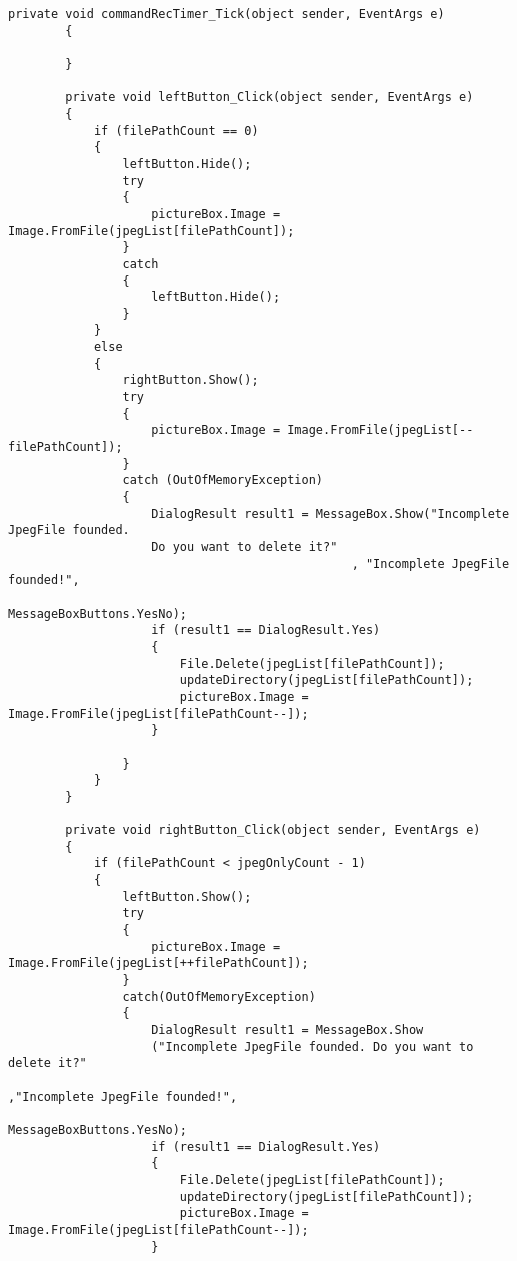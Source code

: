 \begin{lstlisting}[caption=Main Form of GUI, label=appen:main_form]
        private void commandRecTimer_Tick(object sender, EventArgs e)
        {

        }

        private void leftButton_Click(object sender, EventArgs e)
        {
            if (filePathCount == 0)
            {
                leftButton.Hide();
                try
                {
                    pictureBox.Image = Image.FromFile(jpegList[filePathCount]);
                }
                catch
                {
                    leftButton.Hide();
                }
            }
            else
            {
                rightButton.Show();
                try
                {
                    pictureBox.Image = Image.FromFile(jpegList[--filePathCount]);
                }
                catch (OutOfMemoryException)
                {
                    DialogResult result1 = MessageBox.Show("Incomplete JpegFile founded. 
                    Do you want to delete it?"
                                                , "Incomplete JpegFile founded!",
                                                 MessageBoxButtons.YesNo);
                    if (result1 == DialogResult.Yes)
                    {
                        File.Delete(jpegList[filePathCount]);
                        updateDirectory(jpegList[filePathCount]);
                        pictureBox.Image = Image.FromFile(jpegList[filePathCount--]);
                    }
                    
                }
            }
        }

        private void rightButton_Click(object sender, EventArgs e)
        {
            if (filePathCount < jpegOnlyCount - 1)
            {
                leftButton.Show();
                try
                {
                    pictureBox.Image = Image.FromFile(jpegList[++filePathCount]);
                }
                catch(OutOfMemoryException)
                {
                    DialogResult result1 = MessageBox.Show
                    ("Incomplete JpegFile founded. Do you want to delete it?"
                                                                ,"Incomplete JpegFile founded!",
                                                                 MessageBoxButtons.YesNo);
                    if (result1 == DialogResult.Yes)
                    {
                        File.Delete(jpegList[filePathCount]);
                        updateDirectory(jpegList[filePathCount]);
                        pictureBox.Image = Image.FromFile(jpegList[filePathCount--]);
                    }
                    

\end{lstlisting}
